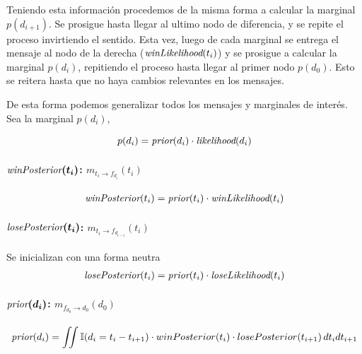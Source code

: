\documentclass[11pt,twoside, spanish]{report} %
\begin{document}
Teniendo esta informaci\'on procedemos de la misma forma a calcular la marginal $p(d_{i+1})$.
Se prosigue hasta llegar al ultimo nodo de diferencia, y se repite el proceso invirtiendo el sentido.
Esta vez, luego de cada marginal se entrega el mensaje al nodo de la derecha ($\emph{winLikelihood}(t_{i})$) y se prosigue a calcular la marginal $p(d_{i})$, repitiendo el proceso hasta llegar al primer nodo $p(d_{0})$.
Esto se reitera hasta que no haya cambios relevantes en los mensajes.

De esta forma podemos generalizar todos los mensajes y marginales de inter\'es.
Sea la marginal $p(d_i)$,

\begin{equation}
p(d_i) = \emph{prior}(d_i) \cdot \emph{likelihood}(d_i)
\end{equation}
\paragraph{$\bm{\emph{winPosterior}(t_i)}$: $m_{t_i \rightarrow f_{d_i}}(t_i)$ }
\begin{equation}
\begin{split}
\emph{winPosterior}(t_{i}) = \emph{prior}(t_i) \cdot \emph{winLikelihood}(t_i)
\end{split}
\end{equation}
\paragraph{$\bm{\emph{losePosterior}(t_i)}$: $m_{t_i \rightarrow f_{d_{i-1}}}(t_i)$}
Se inicializan con una forma neutra
\begin{equation}
\begin{split}
\emph{losePosterior}(t_{i}) = \emph{prior}(t_i) \cdot \emph{loseLikelihood}(t_i)
\end{split}
\end{equation}


\paragraph{$\bm{\emph{prior}(d_i)}$: $m_{f_{d_0} \rightarrow d_0}(d_0)$}

\begin{equation}
\begin{split}
\emph{prior}(d_{i}) = \iint \mathbb{I}(d_{i} = t_i - t_{i+1} ) \cdot winPosterior(t_i) \cdot losePosterior(t_{i+1}) \, dt_idt_{i+1}
\end{split}
\end{equation}
\end{document}
